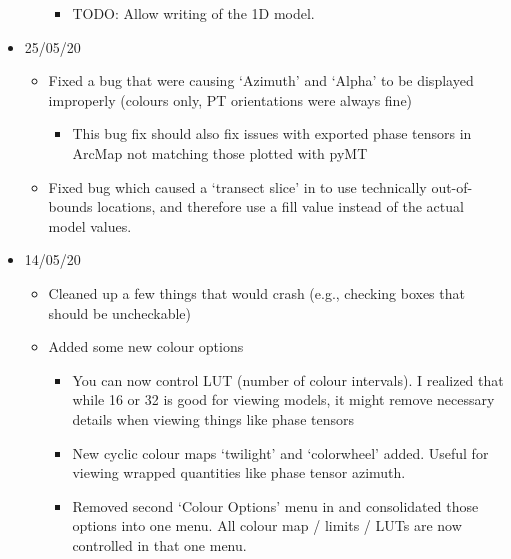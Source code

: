 \documentclass[letterpaper,10pt,english]{sphinxmanual}
\begin{document}
\begin{itemize}
\begin{itemize}
\begin{itemize}
\item {} 
TODO: Allow writing of the 1D model.

\end{itemize}

\end{itemize}

\item {} 
25/05/20
\begin{itemize}
\item {} 
Fixed a bug that were causing ‘Azimuth’ and ‘Alpha’ to be displayed improperly (colours only, PT orientations were always fine)
\begin{itemize}
\item {} 
This bug fix should also fix issues with exported phase tensors in ArcMap not matching those plotted with pyMT

\end{itemize}

\item {} 
Fixed bug which caused a ‘transect slice’ in {\hyperref[\detokenize{content/model_viewer/main_window:model-viewer}]{}} to use technically out-of-bounds locations, and therefore use a fill value instead of the actual model values.

\end{itemize}

\item {} 
14/05/20
\begin{itemize}
\item {} 
Cleaned up a few things that would crash {\hyperref[\detokenize{content/data_plot/main_window:data-plot}]{}} (e.g., checking boxes that should be uncheckable)

\item {} 
Added some new colour options
\begin{itemize}
\item {} 
You can now control LUT (number of colour intervals). I realized that while 16 or 32 is good for viewing models, it might remove necessary details when viewing things like phase tensors

\item {} 
New cyclic colour maps ‘twilight’ and ‘colorwheel’ added. Useful for viewing wrapped quantities like phase tensor azimuth.

\item {} 
Removed second ‘Colour Options’ menu in {\hyperref[\detokenize{content/data_plot/map_viewer:map-viewer}]{}} and consolidated those options into one menu. All colour map / limits / LUTs are now controlled in that one menu.


\end{itemize}
\end{itemize}
\end{itemize}
\end{document}
